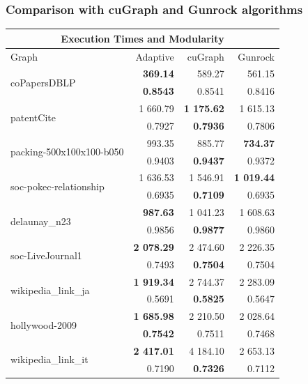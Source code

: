 \subsubsection{Comparison with cuGraph and Gunrock algorithms}
\begin{table}[t!]
	\centering
	\begin{tabular}{ |l||r||r|r|}
		\hline
		\multicolumn{4}{|c|}{Execution Times and Modularity} \\
		\hline
		Graph & Adaptive & cuGraph & Gunrock \\
		\hline
		\multirow{ 2}{*}{coPapersDBLP}				& \textbf{369.14} 	&  589.27  	&  561.15 \\
													& \textbf{0.8543} 	&  0.8541  	&  0.8416 \\\hline
		\multirow{ 2}{*}{patentCite} 				& 1 660.79	& \textbf{1 175.62} 	&  1 615.13 \\
													& 0.7927	& \textbf{0.7936}   	&  0.7806 \\\hline
		\multirow{ 2}{*}{packing-500x100x100-b050}	& 993.35    & 885.77	&  \textbf{734.37} \\
													& 0.9403	& \textbf{0.9437} 	&  0.9372\\\hline
		\multirow{ 2}{*}{soc-pokec-relationship}	& 1 636.53	& 1 546.91 	&\textbf{ 1 019.44} \\ 
													& 0.6935 	& \textbf{0.7109} 	& 0.6935 \\ \hline
		\multirow{ 2}{*}{delaunay\_n23 }			& \textbf{987.63} 	& 1 041.23 	& 1 608.63 \\
													& 0.9856 	&\textbf{ 0.9877} 	& 0.9860 \\\hline
		\multirow{ 2}{*}{soc-LiveJournal1}			& \textbf{2 078.29}  & 2 474.60 	& 2 226.35 \\
													& 0.7493 	& \textbf{0.7504} 	& 0.7504 \\\hline
		\multirow{ 2}{*}{wikipedia\_link\_ja} 		&\textbf{ 1 919.34}  & 2 744.37 	& 2 283.09 \\
													& 0.5691	&\textbf{ 0.5825 }	& 0.5647 \\\hline
		\multirow{ 2}{*}{hollywood-2009} 			& \textbf{1 685.98}	& 2 210.50 	& 2 028.64 \\
													& \textbf{0.7542} 	& 0.7511 	& 0.7468 \\\hline
		\multirow{ 2}{*}{wikipedia\_link\_it} 		& \textbf{2 417.01}	& 4 184.10 	& 2 653.13 \\
													& 0.7190	& \textbf{0.7326} 	& 0.7112 \\\hline

\end{tabular}
\end{table}
